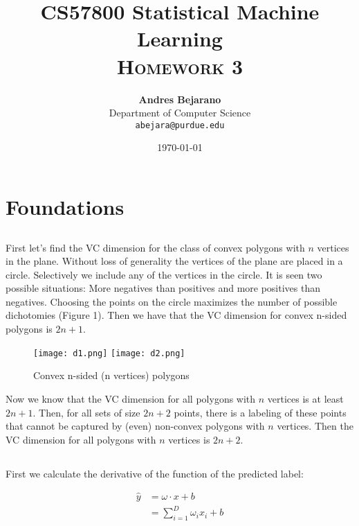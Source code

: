 \documentclass[11pt]{article}
\title{
\textbf{CS57800 Statistical Machine Learning} \\ \textsc{Homework 3} \\
\normalsize\vspace{0.1in}
}
\author{
	\textbf{Andres Bejarano} \\
	Department of Computer Science\\
	\texttt{abejara@purdue.edu}
}
\date{\today}
\begin{document}
\maketitle

\section{Foundations}


\subsection{}
First let's find the VC dimension for the class of convex polygons with $n$ vertices in the plane. Without loss of generality the vertices of the plane are placed in a circle. Selectively we include any of the vertices in the circle. It is seen two possible situations: More negatives than positives and more positives than negatives. Choosing the points on the circle maximizes the number of possible dichotomies (Figure 1). Then we have that the VC dimension for convex n-sided polygons is $2n+1$.

\begin{figure}[H]
  \caption{Convex n-sided (n vertices) polygons}
  \texttt{[image: d1.png]}
  \texttt{[image: d2.png]}
  \centering
\end{figure}

Now we know that the VC dimension for all polygons with $n$ vertices is at least $2n + 1$. Then, for all sets of size $2n + 2$ points, there is a labeling of these points that cannot be captured by (even) non-convex polygons with $n$ vertices. Then the VC dimension for all polygons with $n$ vertices is $2n+2$.

\subsection{}

First we calculate the derivative of the function of the predicted label:

\begin{align*} 
\hat{y} &= \omega \cdot x + b\\
&=\sum_{i=1}^{D}\omega_i x_i + b\\
\end{align*}
\end{document}

